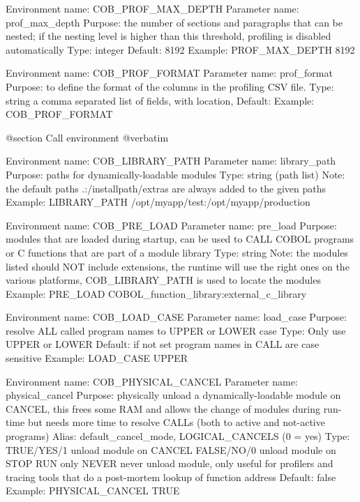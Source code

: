 Environment name:  COB_PROF_MAX_DEPTH
  Parameter name:  prof_max_depth
         Purpose:  the number of sections and paragraphs that can be nested;
                   if the nesting level is higher than this threshold,
                   profiling is disabled automatically
            Type:  integer
         Default:  8192
         Example:  PROF_MAX_DEPTH  8192

Environment name:  COB_PROF_FORMAT
  Parameter name:  prof_format
         Purpose:  to define the format of the columns in the profiling CSV file.
            Type:  string a comma separated list of fields, with %
                   location, %
         Default:  %
         Example:  COB_PROF_FORMAT %


@section Call environment
@verbatim


Environment name:  COB_LIBRARY_PATH
  Parameter name:  library_path
         Purpose:  paths for dynamically-loadable modules
            Type:  string (path list)
            Note:  the default paths .:/installpath/extras are always
                   added to the given paths
         Example:  LIBRARY_PATH    /opt/myapp/test:/opt/myapp/production

Environment name:  COB_PRE_LOAD
  Parameter name:  pre_load
         Purpose:  modules that are loaded during startup, can be used
                   to CALL COBOL programs or C functions that are part
                   of a module library
            Type:  string
            Note:  the modules listed should NOT include extensions, the
                   runtime will use the right ones on the various platforms,
                   COB_LIBRARY_PATH is used to locate the modules
         Example:  PRE_LOAD      COBOL_function_library:external_c_library

Environment name:  COB_LOAD_CASE
  Parameter name:  load_case
         Purpose:  resolve ALL called program names to UPPER or LOWER case
            Type:  Only use  UPPER  or  LOWER
         Default:  if not set program names in CALL are case sensitive
         Example:  LOAD_CASE  UPPER

Environment name:  COB_PHYSICAL_CANCEL
  Parameter name:  physical_cancel
         Purpose:  physically unload a dynamically-loadable module on CANCEL,
                   this frees some RAM and allows the change of modules during
                   run-time but needs more time to resolve CALLs (both to
                   active and not-active programs)
           Alias:  default_cancel_mode, LOGICAL_CANCELS (0 = yes)
            Type:  TRUE/YES/1  unload module on CANCEL
                   FALSE/NO/0  unload module on STOP RUN only
                   NEVER       never unload module, only useful for profilers
                               and tracing tools that do a post-mortem lookup
                               of function address
         Default:  false
         Example:  PHYSICAL_CANCEL  TRUE


